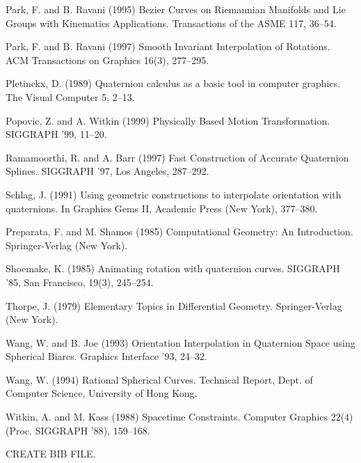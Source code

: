 \documentclass[11pt]{article}
\begin{document}
\begin{thebibliography}{99}
Park, F. and B. Ravani (1995)
Bezier Curves on Riemannian Manifolds and Lie Groups with
Kinematics Applications.
Transactions of the ASME 117, 36--54.

Park, F. and B. Ravani (1997)
Smooth Invariant Interpolation of Rotations.
ACM Transactions on Graphics 16(3), 277--295.

Pletinckx, D. (1989) 
Quaternion calculus as a basic tool in computer graphics.
The Visual Computer 5, 2--13.

Popovic, Z. and A. Witkin (1999)
Physically Based Motion Transformation.
SIGGRAPH '99, 11--20.

Ramamoorthi, R. and A. Barr (1997)
Fast Construction of Accurate Quaternion Splines.
SIGGRAPH '97, Los Angeles, 287--292.

Schlag, J. (1991) Using geometric constructions to interpolate
orientation with quaternions.  In Graphics Gems II, Academic Press (New York),
377--380.

Preparata, F. and M. Shamos (1985)
Computational Geometry: An Introduction.
Springer-Verlag (New York).

Shoemake, K. (1985) Animating rotation with quaternion curves.
SIGGRAPH '85, San Francisco, 19(3), 245--254.

Thorpe, J. (1979)
Elementary Topics in Differential Geometry.
Springer-Verlag (New York).

Wang, W. and B. Joe (1993)
Orientation Interpolation in Quaternion Space using Spherical Biarcs.
Graphics Interface '93, 24--32.

Wang, W. (1994)
Rational Spherical Curves.
Technical Report, Dept. of Computer Science, University of Hong Kong.

Witkin, A. and M. Kass (1988)
Spacetime Constraints.
Computer Graphics 22(4) (Proc. SIGGRAPH '88), 159--168.


\end{thebibliography}

CREATE BIB FILE.
\end{document}
